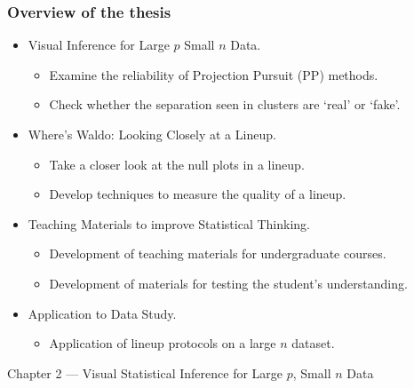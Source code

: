 \documentclass{beamer}
\begin{document}
\begin{frame}
\frametitle{Overview of the thesis}
  \begin{itemize}
    \item Visual Inference for Large $p$ Small $n$ Data.
		  \begin{itemize}
			  \item Examine the reliability of Projection Pursuit (PP) methods.
			  \item Check whether the separation seen in clusters are `real' or `fake'.
		  \end{itemize}
    \item Where's Waldo: Looking Closely at a Lineup.
		  \begin{itemize}
			  \item Take a closer look at the null plots in a lineup.
			  \item Develop techniques to measure the quality of a lineup.
		  \end{itemize}	  	  		
    \item Teaching Materials to improve Statistical Thinking.
		  \begin{itemize}
			  \item Development of teaching materials for undergraduate courses. 
			  \item Development of materials for testing the student's understanding.
		  \end{itemize}	  
    \item Application to Data Study.
		  \begin{itemize}
			  \item Application of lineup protocols on a large $n$ dataset.
		  \end{itemize}	    		  		  
  \end{itemize}		  
\end{frame}


\begin{frame}
\begin{block}{}
\begin{center} \Large{Chapter 2 --- Visual Statistical Inference for Large $p$, Small $n$ Data} \end{center}
\end{block}
\end{frame}
\end{document}
